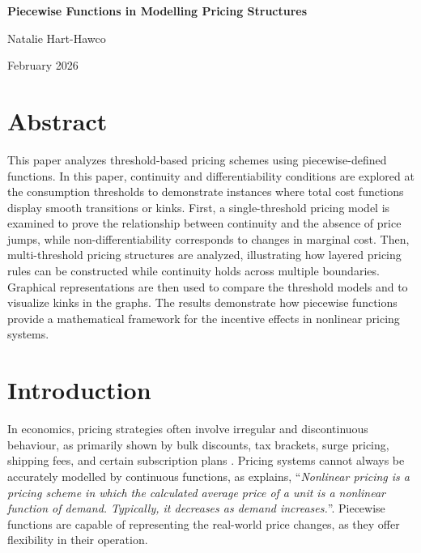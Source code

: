\documentclass{article}
\begin{document}
\thispagestyle{empty}
\begin{center}
\vspace*{4cm}
{\Huge\bfseries Piecewise Functions in Modelling Pricing
Structures\par}
\vspace{1.5cm}
{\large Natalie Hart-Hawco\par}
\vspace{0.5cm}
{\large February 2026\par}
\end{center}


\thispagestyle{empty} 
\newpage
\tableofcontents
\thispagestyle{empty} 
\newpage


\section{Abstract}
This paper analyzes threshold-based pricing schemes using piecewise-defined functions. In this paper, continuity and differentiability conditions are explored at the consumption thresholds to demonstrate instances where total cost functions display smooth transitions or kinks. First, a single-threshold pricing model is examined to prove the relationship between continuity and the absence of price jumps, while non-differentiability corresponds to changes in marginal cost. Then, multi-threshold pricing structures are analyzed, illustrating how layered pricing rules can be constructed while continuity holds across multiple boundaries. Graphical representations are then used to compare the threshold models and to visualize kinks in the graphs. The results demonstrate how piecewise functions provide a mathematical framework for the incentive effects in nonlinear pricing systems.



\section{Introduction}
In economics, pricing strategies often involve irregular and discontinuous behaviour, as primarily shown by bulk discounts, tax brackets, surge pricing, shipping fees, and certain subscription plans 
\textcite{K2017}. Pricing systems cannot always be accurately modelled by continuous functions, as \textcite{radic2024} explains,
\enquote{\textit{Nonlinear pricing is a pricing scheme in which the calculated average price of a unit is a nonlinear function of demand. Typically, it decreases as demand increases.}}. Piecewise functions are capable of representing the real-world price changes, as they offer flexibility in their operation.
\end{document}
